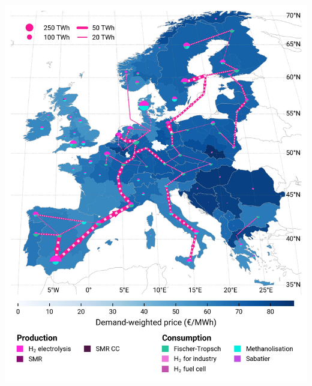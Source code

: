 \documentclass[a0,portrait]{a0poster}
\begin{document}
\begin{multicols}{3}
\begin{center}
    \includegraphics[width=\linewidth]{base_s_adm___2050-balance_map_H2.jpg}
    \label{fig:PCI-in_lt_2050_h2}
\end{center}








\end{multicols}
\end{document}
